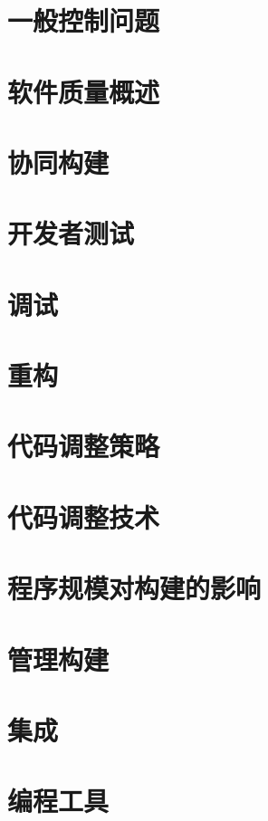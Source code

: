 \documentclass{article}
\begin{document}
\section{一般控制问题}

\section{软件质量概述}

\section{协同构建}

\section{开发者测试}

\section{调试}

\section{重构}

\section{代码调整策略}

\section{代码调整技术}

\section{程序规模对构建的影响}

\section{管理构建}

\section{集成}

\section{编程工具}
\end{document}
